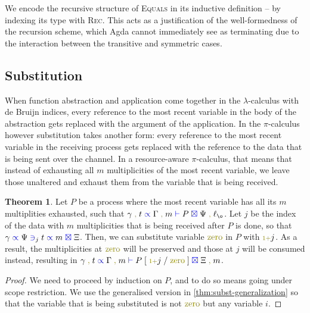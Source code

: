 \documentclass[a4paper,UKenglish,cleveref, autoref, thm-restate,authorcolumns]{lipics-v2019}
\theoremstyle{definition}
\newtheorem{nitheorem}[theorem]{Theorem}
\newcommand{\lambdacalc}{$\lambda$-calculus}
\newcommand{\picalc}{$\pi$-calculus}
\newcommand{\type}[1]{\textcolor{blue}{\operatorname{#1}}}
\newcommand{\constr}[1]{\textcolor{olive}{\operatorname{#1}}}
\newcommand{\suc}{\constr{\scriptstyle 1+}}
\newcommand{\comma}{\; \constr{,} \;}
\newcommand{\subst}[3]{#1 \; [ \; #2 \; / \;#3 \;]}
\newcommand{\lz}{\ell_{\o}}
\newcommand{\types}[4]{#1 \; \type{\propto} \; #2 \; \type{\vdash} \; #3 \; \type{\boxtimes} \; #4}
\newcommand{\contains}[6]{#1 \; \type{\propto} \; #2 \; \type{\ni}_{#3} \; #4 \; \type{\propto} \; #5 \; \type{\boxtimes} \; #6}
\begin{document}
\begin{remark}
  We encode the recursive structure of \textsc{Equals} in its inductive definition -- by indexing its type with \textsc{Rec}.
  This acts as a justification of the well-formedness of the recursion scheme, which Agda cannot immediately see as terminating due to the interaction between the transitive and symmetric cases.
\end{remark}

\subsection{Substitution}
\label{substitution}

When function abstraction and application come together in the \lambdacalc{} with de Bruijn indices, every reference to the most recent variable in the body of the abstraction gets replaced with the argument of the application.
In the \picalc{} however substitution takes another form: every reference to the most recent variable in the receiving process gets replaced with the reference to the data that is being sent over the channel.
In a resource-aware \picalc{}, that means that instead of exhausting all $m$ multiplicities of the most recent variable, we leave those unaltered and exhaust them from the variable that is being received.

\begin{nitheorem}
  \label{thm:substitution}
  Let $P$ be a process where the most recent variable has all its $m$ multiplities exhausted, such that $\types{\gamma \comma t}{\Gamma \comma m}{P}{\Psi \comma \lz}$.
  Let $j$ be the index of the data with $m$ multiplicities that is being received after $P$ is done, so that $\contains{\gamma}{\Psi}{j}{t}{m}{\Xi}$.
  Then, we can substitute variable $\constr{zero}$ in $P$ with $\suc j$.
  As a result, the multiplicities at $\constr{zero}$ will be preserved and those at $j$ will be consumed instead, resulting in $\types{\gamma \comma t}{\Gamma \comma m}{\subst{P}{\suc j}{\constr{zero}}}{\Xi \comma m}$.
\end{nitheorem}
\begin{proof}
  We need to proceed by induction on $P$, and to do so means going under scope restriction.
  We use the generalised version in \autoref{thm:subst-generalization} so that the variable that is being substituted is not $\constr{zero}$ but any variable $i$.
\end{proof}
\end{document}
